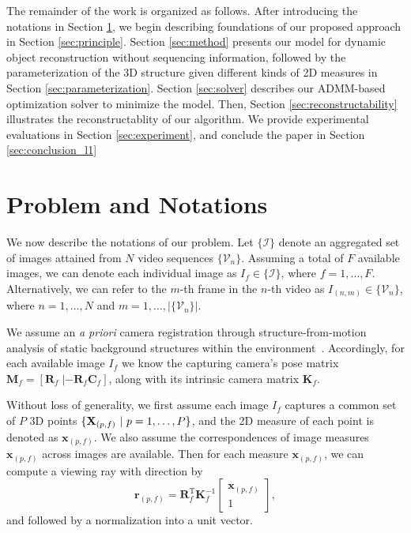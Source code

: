 The remainder of the work is organized as follows.
After introducing the notations in Section \ref{sec:problem_and_notations}, we begin describing foundations of our proposed approach in Section \ref{sec:principle}. Section \ref{sec:method} presents our model for dynamic object reconstruction without sequencing information, followed by the parameterization of the 3D structure given different kinds of 2D measures in Section \ref{sec:parameterization}.
Section \ref{sec:solver} describes our ADMM-based optimization solver to minimize the model. Then, Section \ref{sec:reconstructability} illustrates the reconstructablity of our algorithm. We provide experimental evaluations in Section \ref{sec:experiment}, and conclude the paper in Section \ref{sec:conclusion_l1}


\section{Problem and Notations} \label{sec:problem_and_notations}

We now describe the notations of our problem.
Let $\{\mathcal I\}$ denote an aggregated set of images attained from $N$ video sequences $\{\mathcal V_n \}$.
Assuming a total of $F$ available images, we can denote each individual image as $I_f \in \{\mathcal I\} $, where  $f=1,\dots,F$.
Alternatively, we can refer to  the $m$-th frame in the $n$-th video as $I_{(n,m)} \in\{\mathcal V_n \}$, where $n=1,\dots,N$ and $m=1,\dots, \left\vert{\{\mathcal V_n \}}\right\vert$.

We assume an {\em a priori} camera registration  through structure-from-motion analysis of  static background structures within the environment~\cite{WuVSFM}.
Accordingly, for each available image  $I_f$ we know the capturing camera's pose matrix
$\mathbf M_f=\left[  \mathbf{R}_f  \; |-\mathbf{R}_f \mathbf{C}_f\right]$,
along with its intrinsic camera matrix $\mathbf K_f$.

Without loss of generality, we first assume each image $I_f$ captures a common set of $P$ 3D points $\{\mathbf X_{(p,f)}~|~p=1,\dots,P\}$, and the 2D measure of each point is denoted as $\mathbf{x}_{(p,f)}$.
We also assume the correspondences of image measures $\mathbf{x}_{(p,f)}$ across images are available. 
Then for each measure $\mathbf x_{(p,f)}$, %
we can compute a viewing ray with direction by 
\begin{equation}
\mathbf{r}_{(p,f)}=\mathbf{R}_f^{\text{T}} \mathbf{K}^{-1}_f 
\left[ 
\begin{matrix}   \mathbf{x}_{(p,f)} \\ 1  \end{matrix} 
\right],
\end{equation}
and followed by a normalization into a unit vector.

